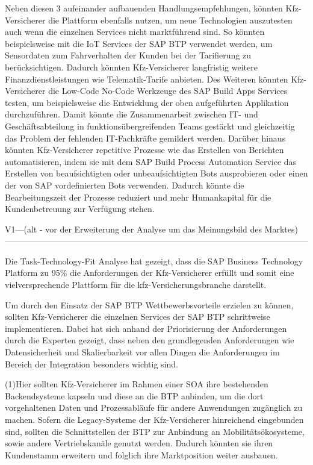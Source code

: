 Neben diesen 3 aufeinander aufbauenden Handlungsempfehlungen, könnten Kfz-Versicherer die Plattform ebenfalls nutzen, um neue Technologien auszutesten auch wenn die einzelnen Services nicht marktführend sind. So könnten beispielsweise mit die IoT Services der SAP BTP verwendet werden, um Sensordaten zum Fahrverhalten der Kunden bei der Tarifierung zu berücksichtigen. Dadurch könnten Kfz-Versicherer langfristig weitere Finanzdienstleistungen wie Telematik-Tarife anbieten. Des Weiteren könnten Kfz-Versicherer die Low-Code No-Code Werkzeuge des SAP Build Apps Services testen, um beispielsweise die Entwicklung der oben aufgeführten Applikation durchzuführen. Damit könnte die Zusammenarbeit zwischen IT- und Geschäftsabteilung in funktionsübergreifenden Teams gestärkt und gleichzeitig das Problem der fehlenden IT-Fachkräfte gemildert werden. Darüber hinaus könnten Kfz-Versicherer repetitive Prozesse wie das Erstellen von Berichten automatisieren, indem sie mit dem SAP Build Process Automation Service das Erstellen von beaufsichtigten oder unbeaufsichtigten Bots ausprobieren oder einen der von SAP vordefinierten Bots verwenden. Dadurch könnte die Bearbeitungszeit der Prozesse reduziert und mehr Humankapital für die Kundenbetreuung zur Verfügung stehen.

\newpage
V1---(alt - vor der Erweiterung der Analyse um das Meinungsbild des Marktes)------------------------------------------------------------------------------------------------------------

Die Task-Technology-Fit Analyse hat gezeigt, dass die SAP Business Technology Platform zu 95\% die Anforderungen der Kfz-Versicherer erfüllt und somit eine vielversprechende Plattform für die \ac{kfz}-Versicherungsbranche darstellt.

Um durch den Einsatz der SAP BTP Wettbewerbsvorteile erzielen zu können, sollten Kfz-Versicherer die einzelnen Services der SAP BTP schrittweise implementieren. Dabei hat sich anhand der Priorisierung der Anforderungen durch die Experten gezeigt, dass neben den grundlegenden Anforderungen wie Datensicherheit und Skalierbarkeit vor allen Dingen die Anforderungen im Bereich der Integration besonders wichtig sind.

(1)Hier sollten Kfz-Versicherer im Rahmen einer SOA ihre bestehenden Backendsysteme kapseln und diese an die BTP anbinden, um die dort vorgehaltenen Daten und Prozessabläufe für andere Anwendungen zugänglich zu machen. Sofern die Legacy-Systeme der Kfz-Versicherer hinreichend eingebunden sind, sollten die Schnittstellen der BTP zur Anbindung an Mobilitätsökosysteme, sowie andere Vertriebskanäle genutzt werden. Dadurch könnten sie ihren Kundenstamm erweitern und folglich ihre Marktposition weiter ausbauen. 

